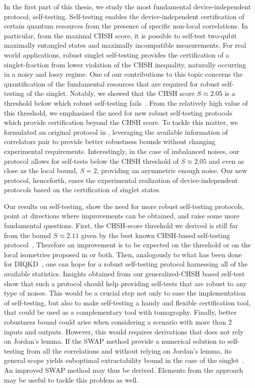 In the first part of this thesis, we study the most fundamental device-independent protocol, self-testing.
Self-testing enables the device-independent certification of certain quantum resources from the presence of specific non-local correlations.
In particular, from the maximal CHSH score, it is possible to self-test two-qubit maximally entangled states and maximally incompatible measurements.
For real world applications, robust singlet self-testing provides the certification of a singlet-fraction from lower violation of the CHSH inequality, naturally occurring in a noisy and lossy regime. 
One of our contributions to this topic concerns the quantification of the fundamental resources that are required for robust self-testing of the singlet.
Notably, we showed that the CHSH score $S\approx 2.05$ is a threshold below which robust self-testing fails~\cite{Valcarce2020}.
From the relatively high value of this threshold, we emphasized the need for new robust self-testing protocols which provide certification beyond the CHSH score.
To tackle this matter, we formulated an original protocol in \cite{Valcarce2022}, leveraging the available information of correlators pair to provide better robustness bounds without changing experimental requirements.
Interestingly, in the case of imbalanced noises, our protocol allows for self-tests below the CHSH threshold of $S\approx 2.05$ and even as close as the local bound, $S=2$, providing an asymmetric enough noise. 
Our new protocol, henceforth, eases the experimental realization of device-independent protocols based on the certification of singlet states.


\medbreak

Our results on self-testing, show the need for more robust self-testing protocols, point at directions where improvements can be obtained, and raise some more fundamental questions.
First, the CHSH-score threshold we derived is still far from the bound $S\approx 2.11$ given by the best known CHSH-based self-testing protocol~\cite{Kaniewski2016}.
Therefore an improvement is to be expected on the threshold or on the local isometries proposed in \cite{Kaniewski2016} or both.
Then, analogously to what has been done for DIQKD~\cite{Brown2021}, one can hope for a robust self-testing protocol harnessing all of the available statistics.
Insights obtained from our generalized-CHSH based self-test show that such a protocol should help providing self-tests that are robust to any type of noises.
This would be a crucial step not only to ease the implementation of self-testing, but also to make self-testing a handy and flexible certification tool, that could be used as a complementary tool with tomography.
Finally, better robustness bound could arise when considering a scenario with more than 2 inputs and outputs.
However, this would requires derivations that does not rely on Jordan's lemma.
If the SWAP method provide a numerical solution to self-testing from all the correlations and without relying on Jordan's lemma, its general scope yields suboptimal extractability bound in the case of the singlet~\cite{Yang2014,Bancal2015}.
An improved SWAP method may thus be derived.
Elements from the approach \cite{Brown2021} may be useful to tackle this problem as well.

